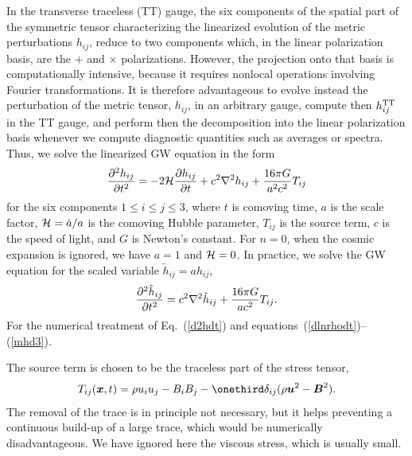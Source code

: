 \documentclass[\mydriver,12pt,twoside,notitlepage,a4paper]{article}
\renewcommand{\vec}[1]{\mbox{\boldmath{$#1$}}}
\newcommand{\Bv}            {\vec{B}}
\newcommand{\uv}            {\vec{u}}
\newcommand{\xv}            {\vec{x}}
\newcommand{\Eq}[1]{Eq.~(\ref{#1})}
\begin{document}
In the transverse traceless (TT) gauge, the six components of the
spatial part of the symmetric tensor characterizing the linearized
evolution of the metric perturbations $h_{ij}$,
reduce to two components which, in the linear polarization
basis, are the $+$ and $\times$ polarizations.
However, the projection onto that basis is computationally intensive,
because it requires nonlocal operations involving Fourier transformations.
It is therefore advantageous to evolve instead the perturbation of the metric
tensor, $h_{ij}$, in an arbitrary gauge, compute then $h_{ij}^{\rm TT}$ in
the TT gauge, and perform then the decomposition into the linear polarization
basis whenever we compute diagnostic quantities such as averages or spectra.
Thus, we solve the linearized GW equation in the form \cite{Dur08}
\begin{equation}
{\partial^2h_{ij}\over\partial t^2}
=-2{\cal H}{\partial h_{ij}\over\partial t}
+c^2\nabla^2h_{ij}+{16\pi G\over a^2 c^2} T_{ij}
\label{d2hdt}
\end{equation}
for the six components $1\leq i\leq j\leq3$, where $t$ is comoving time,
$a$ is the scale factor, ${\cal H}=\dot{a}/a$ is the comoving Hubble
parameter, $T_{ij}$ is the source term, $c$ is the speed of light,
and $G$ is Newton's constant.
For $n=0$, when the cosmic expansion is ignored, we have $a=1$ and
${\cal H}=0$.
In practice, we solve the GW equation for the scaled variable
$\tilde{h}_{ij}=ah_{ij}$,
\begin{equation}
{\partial^2\tilde{h}_{ij}\over\partial t^2}
=c^2\nabla^2\tilde{h}_{ij}+{16\pi G\over a c^2} T_{ij}.
\label{d2hdt}
\end{equation}
For the numerical treatment of \Eq{d2hdt} and
equations~(\ref{dlnrhodt})--(\ref{mhd3}).

The source term is chosen to be the traceless part of the stress tensor,
\begin{equation}
T_{ij}(\xv,t)=\rho u_i u_j - B_i B_j
- \onethird\delta_{ij}(\rho\uv^2-\Bv^2).
\end{equation}
The removal of the trace is in principle not necessary, but it helps
preventing a continuous build-up of a large trace, which would be
numerically disadvantageous.
We have ignored here the viscous stress, which is usually small.
\end{document}
